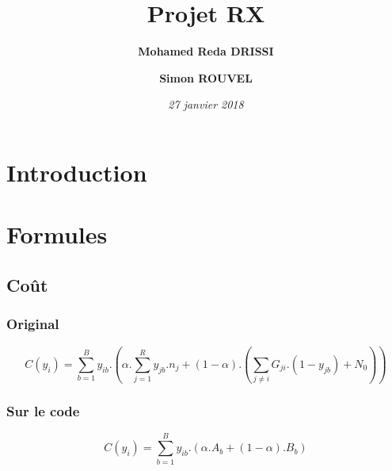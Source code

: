 \documentclass[a4paper,sans,titlepage,10pt]{article}
\title{Projet RX}
\author { \textbf{Mohamed Reda DRISSI }
			\and
		   \textbf{Simon ROUVEL}}
\date{\textit{27 janvier 2018}}
\begin{document}
\maketitle

\tableofcontents
\clearpage
\section{Introduction}
\section{Formules}
\subsection{Coût}
\subsubsection{Original}
\begin{displaymath}
C(y_i)= \sum_{b=1}^By_{ib}.\left(\alpha.\sum_{j=1}^Ry_{jb}.n_j+(1-\alpha).(\sum_{j\neq i}G_{ji}.(1-y_{jb})+N_0)\right)
\end{displaymath}
\subsubsection{Sur le code}
\begin{displaymath}
C(y_i)= \sum_{b=1}^By_{ib}.(\alpha.A_b+(1-\alpha).B_b)
\end{displaymath}
\end{document}
